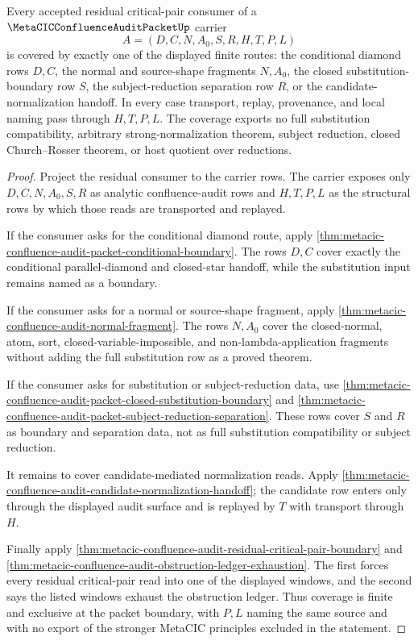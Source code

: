 \begin{theorem}
\label{thm:metacic-confluence-audit-critical-pair-coverage}
Every accepted residual critical-pair consumer of a $\MetaCICConfluenceAuditPacketUp$ carrier
$$
A=(D,C,N,A_0,S,R,H,T,P,L)
$$
is covered by exactly one of the displayed finite routes: the conditional diamond rows $D,C$, the normal and source-shape fragments $N,A_0$, the closed substitution-boundary row $S$, the subject-reduction separation row $R$, or the candidate-normalization handoff. In every case transport, replay, provenance, and local naming pass through $H,T,P,L$. The coverage exports no full substitution compatibility, arbitrary strong-normalization theorem, subject reduction, closed Church--Rosser theorem, or host quotient over reductions.
\end{theorem}
\begin{proof}
Project the residual consumer to the carrier rows. The carrier exposes only $D,C,N,A_0,S,R$ as analytic confluence-audit rows and $H,T,P,L$ as the structural rows by which those reads are transported and replayed.

If the consumer asks for the conditional diamond route, apply \autoref{thm:metacic-confluence-audit-packet-conditional-boundary}. The rows $D,C$ cover exactly the conditional parallel-diamond and closed-star handoff, while the substitution input remains named as a boundary.

If the consumer asks for a normal or source-shape fragment, apply \autoref{thm:metacic-confluence-audit-normal-fragment}. The rows $N,A_0$ cover the closed-normal, atom, sort, closed-variable-impossible, and non-lambda-application fragments without adding the full substitution row as a proved theorem.

If the consumer asks for substitution or subject-reduction data, use \autoref{thm:metacic-confluence-audit-packet-closed-substitution-boundary} and \autoref{thm:metacic-confluence-audit-packet-subject-reduction-separation}. These rows cover $S$ and $R$ as boundary and separation data, not as full substitution compatibility or subject reduction.

It remains to cover candidate-mediated normalization reads. Apply \autoref{thm:metacic-confluence-audit-candidate-normalization-handoff}; the candidate row enters only through the displayed audit surface and is replayed by $T$ with transport through $H$.

Finally apply \autoref{thm:metacic-confluence-audit-residual-critical-pair-boundary} and \autoref{thm:metacic-confluence-audit-obstruction-ledger-exhaustion}. The first forces every residual critical-pair read into one of the displayed windows, and the second says the listed windows exhaust the obstruction ledger. Thus coverage is finite and exclusive at the packet boundary, with $P,L$ naming the same source and with no export of the stronger MetaCIC principles excluded in the statement.
\end{proof}

